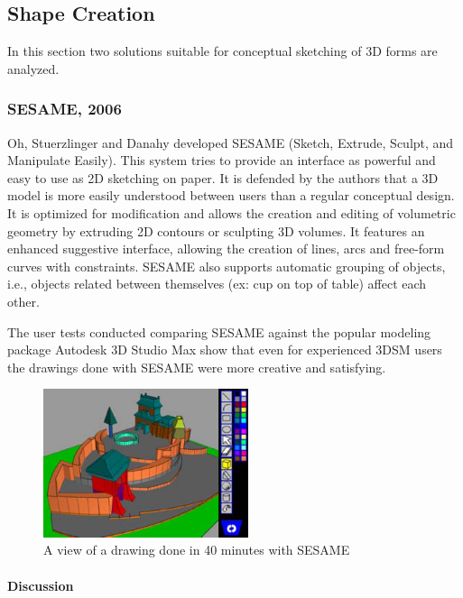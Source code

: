 \subsection{Shape Creation}


In this section two solutions suitable for conceptual sketching of 3D forms are analyzed.

\subsubsection{SESAME, 2006}

Oh, Stuerzlinger and Danahy \cite{SESAME3D} developed SESAME
(Sketch, Extrude, Sculpt, and Manipulate Easily).
This system tries to provide an interface as powerful and easy to use as 2D sketching on paper.
It is defended by the authors that a 3D model is more easily understood between users
than a regular conceptual design.
It is optimized for modification and allows the creation and editing of volumetric geometry
by extruding 2D contours or sculpting 3D volumes.
It features an enhanced suggestive interface, allowing the creation of lines,
arcs and free-form curves with constraints.
SESAME also supports automatic grouping of objects, i.e., objects related
between themselves (ex: cup on top of table) affect each other.

The user tests conducted comparing SESAME against the popular modeling package
Autodesk 3D Studio Max show that even for experienced 3DSM users
the drawings done with SESAME were more creative and satisfying.

\begin{figure}[!ht]
	\centering
	\includegraphics[width=6cm]{gfx/sesame.png}
	\caption{A view of a drawing done in 40 minutes with SESAME}
	\label{FIG-SESAME}
\end{figure}

\paragraph{Discussion}

